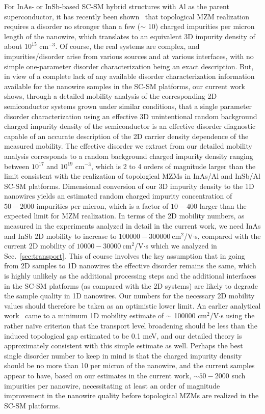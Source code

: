 \documentclass[aps,prmaterials,twocolumn,superscriptaddress,longbibliography]{revtex4-2}
\begin{document}
For InAs- or InSb-based SC-SM hybrid structures with Al as the parent superconductor, it has recently been shown~\cite{woods2021charge} that topological MZM realization requires a disorder no stronger than a few ($\sim$ 10) charged impurities per micron length of the nanowire, which translates to an equivalent 3D impurity density of about $ 10^{15} $  cm$ ^{-3} $.  Of course, the real systems are complex, and impurities/disorder arise from various sources and at various interfaces, with no simple one-parameter disorder characterization being an exact description. But, in view of a complete lack of any available disorder characterization information available for the nanowire samples in the SC-SM platforms, our current work shows, through a detailed mobility analysis of the corresponding 2D semiconductor systems grown under similar conditions, that a single parameter disorder characterization using an effective 3D unintentional random background charged impurity density of the semiconductor is an effective disorder diagnostic capable of an accurate description of the 2D carrier density dependence of the measured mobility.  The effective disorder we extract from our detailed mobility analysis corresponds to a random background charged impurity density ranging between $10^{17}$ and $10^{19} $  cm$ ^{-3}$, which is 2 to 4 orders of magnitude larger than the limit consistent with the realization of topological MZMs in InAs/Al and InSb/Al SC-SM platforms. Dimensional conversion of our 3D impurity density to the 1D nanowires yields an estimated random charged impurity concentration of $50-2000$ impurities per micron, which is a factor of $10-400$ larger than the expected limit for MZM realization. In terms of the 2D mobility numbers, as measured in the experiments analyzed in detail in the current work, we need InAs and InSb 2D mobility to increase to $100000-300000~$cm$ ^2 $/V$ \cdot$s, compared with the current 2D mobility of $10000-30000~$cm$ ^2 $/V$ \cdot$s which we analyzed in Sec.~\ref{sec:transport}. This of course involves the key assumption that in going from 2D samples to 1D nanowires the effective disorder remains the same, which is highly unlikely as the additional processing steps and the additional interfaces in the SC-SM platforms (as compared with the 2D systems) are likely to degrade the sample quality in 1D nanowires.  Our numbers for the necessary 2D mobility values should therefore be taken as an optimistic lower limit.  An earlier analytical work~\cite{sau2012experimental} came to a minimum 1D mobility estimate of $ \sim $ 100000 cm$ ^2 $/V$ \cdot $s using the rather na\"ive criterion that the transport level broadening should be less than the induced topological gap estimated to be 0.1 meV, and our detailed theory is approximately consistent with this simple estimate as well.  Perhaps the best single disorder number to keep in mind is that the charged impurity density should be no more than 10 per micron of the nanowire, and the current samples appear to have, based on our estimates in the current work, $ \sim 50-2000$ such impurities per nanowire, necessitating at least an order of magnitude improvement in the nanowire quality before topological MZMs are realized in the SC-SM platforms.
\end{document}
